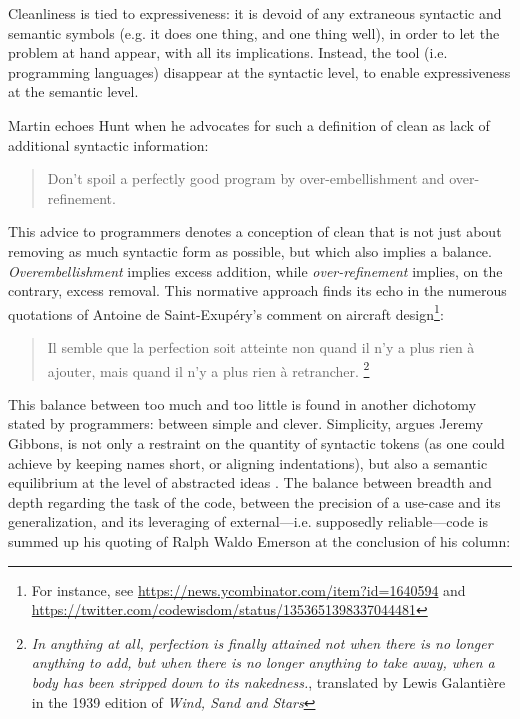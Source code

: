 Cleanliness is tied to expressiveness: it is devoid of any extraneous syntactic and semantic symbols (e.g. it does one thing, and one thing well), in order to let the problem at hand appear, with all its implications. Instead, the tool (i.e. programming languages) disappear at the syntactic level, to enable expressiveness at the semantic level.

Martin echoes Hunt when he advocates for such a definition of clean as lack of additional syntactic information:

\begin{quote}
  Don't spoil a perfectly good program by over-embellishment and over-refinement. \citep{hunt_pragmatic_1999}
\end{quote}

This advice to programmers denotes a conception of clean that is not just about removing as much syntactic form as possible, but which also implies a balance. \emph{Overembellishment} implies excess addition, while \emph{over-refinement} implies, on the contrary, excess removal. This normative approach finds its echo in the numerous quotations of Antoine de Saint-Exupéry's comment on aircraft design\footnote{For instance, see \url{https://news.ycombinator.com/item?id=1640594} and \url{https://twitter.com/codewisdom/status/1353651398337044481}}:

\begin{quote}
  Il semble que la perfection soit atteinte non quand il n'y a plus rien à ajouter, mais quand il n'y a plus rien à retrancher.  \citep{desaint-exupery_terre_1972}\footnote{\emph{ In anything at all, perfection is finally attained not when there is no longer anything to add, but when there is no longer anything to take away, when a body has been stripped down to its nakedness.}, translated by Lewis Galantière in the 1939 edition of \emph{Wind, Sand and Stars}}
\end{quote}

This balance between too much and too little is found in another dichotomy stated by programmers: between simple and clever. Simplicity, argues Jeremy Gibbons, is not only a restraint on the quantity of syntactic tokens (as one could achieve by keeping names short, or aligning indentations), but also a semantic equilibrium at the level of abstracted ideas \citep{gibbons_beauty_2012}. The balance between breadth and depth regarding the task of the code, between the precision of a use-case and its generalization, and its leveraging of external—i.e. supposedly reliable—code is summed up his quoting of Ralph Waldo Emerson at the conclusion of his column:

